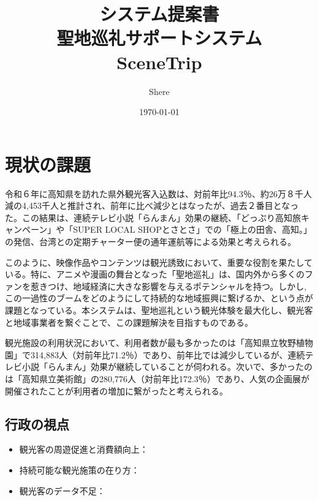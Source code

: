 \documentclass[a4j, 11pt, report]{jsarticle}
\title{
    {\Huge システム提案書} \\
    \vspace{6cm}
    {\Huge 聖地巡礼サポートシステム} \\
    \vspace{0.5cm}
    {\Huge \textbf{SceneTrip}}
}
\author{Shere}
\date{\today}
\begin{document}
\maketitle
\thispagestyle{empty}
\clearpage

\tableofcontents
\clearpage

\section{現状の課題}
令和６年に高知県を訪れた県外観光客入込数は、対前年比94.3％、約26万８千人減の4,453千人と推計され、前年に比べ減少とはなったが、過去２番目となった。この結果は、連続テレビ小説「らんまん」効果の継続、「どっぷり高知旅キャンペーン」や「SUPER LOCAL SHOPとさとさ」での「極上の田舎、高知。」の発信、台湾との定期チャーター便の通年運航等による効果と考えられる。

このように、映像作品やコンテンツは観光誘致において、重要な役割を果たしている。特に、アニメや漫画の舞台となった「聖地巡礼」は、国内外から多くのファンを惹きつけ、地域経済に大きな影響を与えるポテンシャルを持つ。しかし,この一過性のブームをどのようにして持続的な地域振興に繋げるか、という点が課題となっている。本システムは、聖地巡礼という観光体験を最大化し、観光客と地域事業者を繋ぐことで、この課題解決を目指すものである。

観光施設の利用状況において、利用者数が最も多かったのは「高知県立牧野植物園」で314,883人（対前年比71.2％）であり、前年比では減少しているが、連続テレビ小説「らんまん」効果が継続していることが伺われる。次いで、多かったのは「高知県立美術館」の280,776人（対前年比172.3％）であり、人気の企画展が開催されたことが利用者の増加に繋がったと考えられる。

\subsection{行政の視点}
\begin{itemize}
    \item 観光客の周遊促進と消費額向上：
    \item 持続可能な観光施策の在り方：
    \item 観光客のデータ不足：
\end{itemize}
\end{document}
